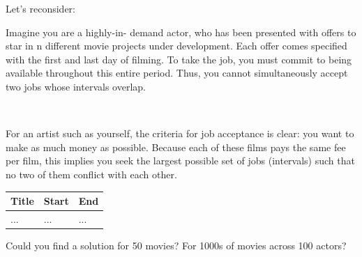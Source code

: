 \documentclass{cons-beamer}
\begin{document}
\begin{frame}
	Let's reconsider: 
	\begin{example}
		\small
		Imagine you are a highly-in-
		demand actor, who has been presented with offers to star in n different movie
		projects under development. Each offer comes specified with the first and last day
		of filming. To take the job, you must commit to being available throughout this
		entire period. Thus, you cannot simultaneously accept two jobs whose intervals
		overlap.
		
		$ $
		
		For an artist such as yourself, the criteria for job acceptance is clear: you want
		to make as much money as possible. Because each of these films pays the same fee
		per film, this implies you seek the largest possible set of jobs (intervals) such that no two of them conflict with each other.
		
		\begin{table}[h!]
			\centering
			\tiny
			\begin{tabular}{| m{5cm} | m{2cm} | m{2cm} |}
				\hline
				\textbf{Title} & \textbf{Start} & \textbf{End} \\
				\hline
				... & ... & ... \\
				\hline
			\end{tabular}
		\end{table}
	\end{example}

	Could you find a solution for 50 movies? For 1000s of movies across 100 actors?
\end{frame}
\end{document}
